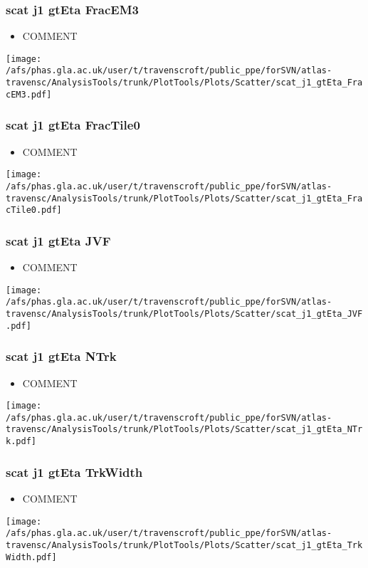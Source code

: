 \documentclass{beamer}
\begin{document}
\begin{frame}
\frametitle{scat j1 gtEta FracEM3}
\begin{itemize}
\item COMMENT
\end{itemize}
\begin{center}
\texttt{[image: /afs/phas.gla.ac.uk/user/t/travenscroft/public\_ppe/forSVN/atlas-travensc/AnalysisTools/trunk/PlotTools/Plots/Scatter/scat\_j1\_gtEta\_FracEM3.pdf]}
\end{center}
\end{frame}

\begin{frame}
\frametitle{scat j1 gtEta FracTile0}
\begin{itemize}
\item COMMENT
\end{itemize}
\begin{center}
\texttt{[image: /afs/phas.gla.ac.uk/user/t/travenscroft/public\_ppe/forSVN/atlas-travensc/AnalysisTools/trunk/PlotTools/Plots/Scatter/scat\_j1\_gtEta\_FracTile0.pdf]}
\end{center}
\end{frame}

\begin{frame}
\frametitle{scat j1 gtEta JVF}
\begin{itemize}
\item COMMENT
\end{itemize}
\begin{center}
\texttt{[image: /afs/phas.gla.ac.uk/user/t/travenscroft/public\_ppe/forSVN/atlas-travensc/AnalysisTools/trunk/PlotTools/Plots/Scatter/scat\_j1\_gtEta\_JVF.pdf]}
\end{center}
\end{frame}

\begin{frame}
\frametitle{scat j1 gtEta NTrk}
\begin{itemize}
\item COMMENT
\end{itemize}
\begin{center}
\texttt{[image: /afs/phas.gla.ac.uk/user/t/travenscroft/public\_ppe/forSVN/atlas-travensc/AnalysisTools/trunk/PlotTools/Plots/Scatter/scat\_j1\_gtEta\_NTrk.pdf]}
\end{center}
\end{frame}

\begin{frame}
\frametitle{scat j1 gtEta TrkWidth}
\begin{itemize}
\item COMMENT
\end{itemize}
\begin{center}
\texttt{[image: /afs/phas.gla.ac.uk/user/t/travenscroft/public\_ppe/forSVN/atlas-travensc/AnalysisTools/trunk/PlotTools/Plots/Scatter/scat\_j1\_gtEta\_TrkWidth.pdf]}
\end{center}
\end{frame}
\end{document}
